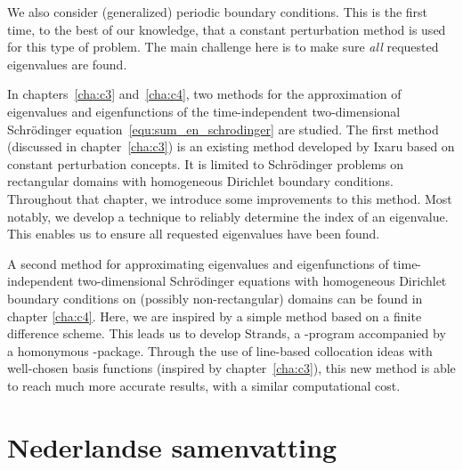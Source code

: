 We also consider (generalized) periodic boundary conditions. This is the first time, to the best of our knowledge, that a constant perturbation method is used for this type of problem. The main challenge here is to make sure \emph{all} requested eigenvalues are found.

In chapters~\ref{cha:c3} and~\ref{cha:c4}, two methods for the approximation of eigenvalues and eigenfunctions of the time-independent two-dimensional Schrödinger equation~\eqref{equ:sum_en_schrodinger}  are studied. The first method (discussed in chapter~\ref{cha:c3}) is an existing method developed by Ixaru based on constant perturbation concepts. It is limited to Schrödinger problems on rectangular domains with homogeneous Dirichlet boundary conditions. Throughout that chapter, we introduce some improvements to this method. Most notably, we develop a technique to reliably determine the index of an eigenvalue. This enables us to ensure all requested eigenvalues have been found.

A second method for approximating eigenvalues and eigenfunctions of time-independent two-dimensional Schrödinger equations with homogeneous Dirichlet boundary conditions on (possibly non-rectangular) domains can be found in chapter \ref{cha:c4}. Here, we are inspired by a simple method based on a finite difference scheme. This leads us to develop Strands, a \cpp{}-program accompanied by a homonymous \lpython{}-package. Through the use of line-based collocation ideas with well-chosen basis functions (inspired by chapter~\ref{cha:c3}), this new method is able to reach much more accurate results, with a similar computational cost.

\section*{Nederlandse samenvatting}


\stopchapter
